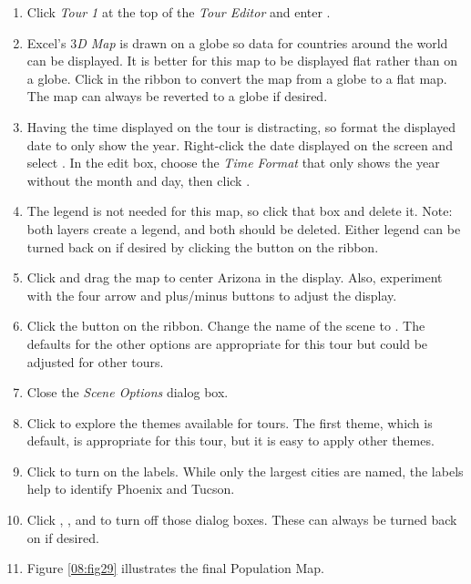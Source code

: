\begin{enumbox}
	\begin{enumerate}
		\item Click \textit{Tour 1} at the top of the \textit{Tour Editor} and enter . 
		\item Excel's \textit{$ 3 $D Map} is drawn on a globe so data for countries around the world can be displayed. It is better for this map to be displayed flat rather than on a globe. Click  in the ribbon to convert the map from a globe to a flat map. The map can always be reverted to a globe if desired.
		\item Having the time displayed on the tour is distracting, so format the displayed date to only show the year. Right-click the date displayed on the screen and select . In the edit box, choose the \textit{Time Format} that only shows the year without the month and day, then click .
		\item The legend is not needed for this map, so click that box and delete it. Note: both layers create a legend, and both should be deleted. Either legend can be turned back on if desired by clicking the  button on the ribbon.
		\item Click and drag the map to center Arizona in the display. Also, experiment with the four arrow and plus/minus buttons to adjust the display.
		\item Click the  button on the ribbon. Change the name of the scene to . The defaults for the other options are appropriate for this tour but could be adjusted for other tours.
		\item Close the \textit{Scene Options} dialog box.
		\item Click  to explore the themes available for tours. The first theme, which is default, is appropriate for this tour, but it is easy to apply other themes.
		\item Click  to turn on the labels. While only the largest cities are named, the labels help to identify Phoenix and Tucson.
		\item Click , , and to turn off those dialog boxes. These can always be turned back on if desired.
		\item Figure \ref{08:fig29} illustrates the final Population Map.
	\end{enumerate}
\end{enumbox}
	
